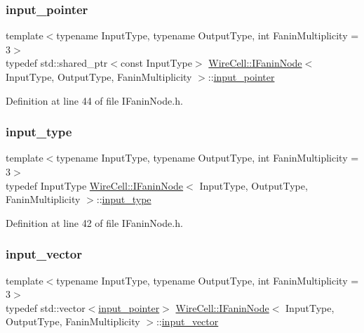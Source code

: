 \subsubsection{\texorpdfstring{input\+\_\+pointer}{input\_pointer}}
{\footnotesize\ttfamily template$<$typename Input\+Type, typename Output\+Type, int Fanin\+Multiplicity = 3$>$ \\
typedef std\+::shared\+\_\+ptr$<$const Input\+Type$>$ \hyperlink{class_wire_cell_1_1_i_fanin_node}{Wire\+Cell\+::\+I\+Fanin\+Node}$<$ Input\+Type, Output\+Type, Fanin\+Multiplicity $>$\+::\hyperlink{class_wire_cell_1_1_i_fanin_node_ae4f0134fe2d798f865d358b24ab0ba9c}{input\+\_\+pointer}}



Definition at line 44 of file I\+Fanin\+Node.\+h.

\mbox{\label{class_wire_cell_1_1_i_fanin_node_ac47c1dc3929cef7fb2ff2412eaf984a1}} 
\subsubsection{\texorpdfstring{input\+\_\+type}{input\_type}}
{\footnotesize\ttfamily template$<$typename Input\+Type, typename Output\+Type, int Fanin\+Multiplicity = 3$>$ \\
typedef Input\+Type \hyperlink{class_wire_cell_1_1_i_fanin_node}{Wire\+Cell\+::\+I\+Fanin\+Node}$<$ Input\+Type, Output\+Type, Fanin\+Multiplicity $>$\+::\hyperlink{class_wire_cell_1_1_i_fanin_node_ac47c1dc3929cef7fb2ff2412eaf984a1}{input\+\_\+type}}



Definition at line 42 of file I\+Fanin\+Node.\+h.

\mbox{\label{class_wire_cell_1_1_i_fanin_node_aec26233b8b7756c5a42280a5db47ffda}} 
\subsubsection{\texorpdfstring{input\+\_\+vector}{input\_vector}}
{\footnotesize\ttfamily template$<$typename Input\+Type, typename Output\+Type, int Fanin\+Multiplicity = 3$>$ \\
typedef std\+::vector$<$\hyperlink{class_wire_cell_1_1_i_fanin_node_ae4f0134fe2d798f865d358b24ab0ba9c}{input\+\_\+pointer}$>$ \hyperlink{class_wire_cell_1_1_i_fanin_node}{Wire\+Cell\+::\+I\+Fanin\+Node}$<$ Input\+Type, Output\+Type, Fanin\+Multiplicity $>$\+::\hyperlink{class_wire_cell_1_1_i_fanin_node_aec26233b8b7756c5a42280a5db47ffda}{input\+\_\+vector}}




